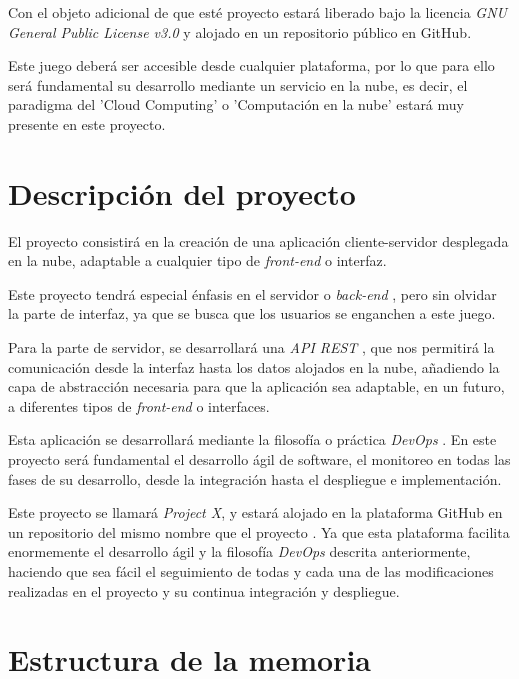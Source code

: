 Con el objeto adicional de que esté proyecto estará liberado bajo la licencia \textit{GNU General Public License v3.0} \cite{licenciaproyecto} y alojado en un repositorio público en GitHub.

Este juego deberá ser accesible desde cualquier plataforma, por lo que para ello será fundamental su desarrollo mediante un servicio en la nube, es decir, el paradigma del 'Cloud Computing' o 'Computación en la nube' \cite{nube1} estará muy presente en este proyecto.

\section{Descripción del proyecto}

El proyecto consistirá en la creación de una aplicación cliente-servidor desplegada en la nube, adaptable a cualquier tipo de \textit{front-end} \cite{frontback} o interfaz.

Este proyecto tendrá especial énfasis en el servidor o \textit{back-end} \cite{frontback}, pero sin olvidar la parte de interfaz, ya que se busca que los usuarios se enganchen a este juego.

Para la parte de servidor, se desarrollará una \textit{API REST} \cite{api1} \cite{api2} \cite{api3}, que nos permitirá la comunicación desde la interfaz hasta los datos alojados en la nube, añadiendo la capa de abstracción necesaria para que la aplicación sea adaptable, en un futuro, a diferentes tipos de \textit{front-end} o interfaces. 

Esta aplicación se desarrollará mediante la filosofía o práctica \textit{DevOps} \cite{devops1} \cite{devops2} \cite{devops3} \cite{devops4}. En este proyecto será fundamental el desarrollo ágil de software, el monitoreo en todas las fases de su desarrollo, desde la integración hasta el despliegue e implementación.

Este proyecto se llamará \textit{Project X}, y estará alojado en la plataforma GitHub en un repositorio del mismo nombre que el proyecto \cite{proyectogithub}. Ya que esta plataforma facilita enormemente el desarrollo ágil y la filosofía \textit{DevOps} descrita anteriormente, haciendo que sea fácil el seguimiento de todas y cada una de las modificaciones realizadas en el proyecto y su continua integración y despliegue.

\section{Estructura de la memoria}
